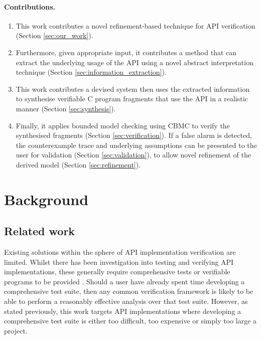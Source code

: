 \documentclass[EPiCempty]{easychair}
\begin{document}
\paragraph{Contributions.}    

\begin{enumerate}[label=(\alph*)]
	\item This work contributes a novel refinement-based technique for API verification (Section \ref{sec:our_work}).
	\item  Furthermore, given appropriate input, it contributes a method that can extract the underlying usage of the API using a novel abstract interpretation technique (Section \ref{sec:information_extraction}). 
	\item This work contributes a devised system then uses the extracted information to synthesise verifiable C program fragments that use the API in a realistic manner (Section \ref{sec:synthesis}). 
	\item Finally, it applies bounded model checking using CBMC to verify the synthesised fragments (Section \ref{sec:verification}).  If a false alarm is detected, the counterexample trace and underlying assumptions can be presented to the user for validation (Section \ref{sec:validation}), to allow novel refinement of the derived model (Section \ref{sec:refinement}).   
\end{enumerate}


\section{Background}
\label{sect:related_work}

\subsection{Related work}
Existing solutions within the sphere of API implementation verification are limited.  Whilst there has been investigation into testing and verifying API implementations, these generally require comprehensive tests or verifiable programs to be provided \cite{DBLP:conf/dsn/SheltonKD00}.  Should a user have already spent time developing a comprehensive test suite, then any common verification framework is likely to be able to perform a reasonably effective analysis over that test suite.   However, as stated previously, this work targets API implementations where developing a comprehensive test suite is either too difficult, too expensive or simply too large a project. 
\end{document}
